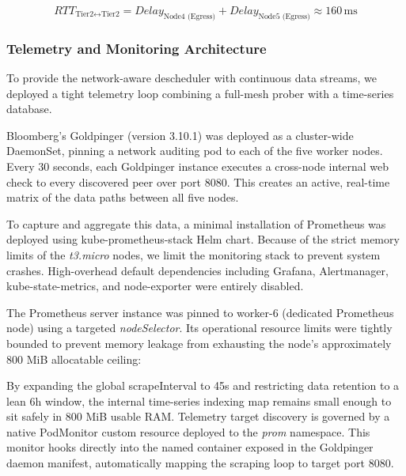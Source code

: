 \[
RTT_{\text{Tier2}\leftrightarrow\text{Tier2}} = Delay_{\text{Node4 (Egress)}} + Delay_{\text{Node5 (Egress)}} \approx 160\,\text{ms}
\]


\subsubsection{Telemetry and Monitoring Architecture}
\label{subsubsec:netaware4_monitoringsetup}
To provide the network-aware descheduler with continuous data streams, we deployed a tight telemetry loop combining a full-mesh prober with a time-series database.

Bloomberg's Goldpinger (version 3.10.1) was deployed as a cluster-wide DaemonSet, pinning a network auditing pod to each of the five worker nodes. Every 30 seconds, each Goldpinger instance executes a cross-node internal web check to every discovered peer over port 8080. This creates an active, real-time matrix of the data paths between all five nodes.

To capture and aggregate this data, a minimal installation of Prometheus was deployed using kube-prometheus-stack Helm chart. Because of the strict memory limits of the \textit{t3.micro} nodes, we limit the monitoring stack to prevent system crashes. High-overhead default dependencies including Grafana, Alertmanager, kube-state-metrics, and node-exporter were entirely disabled.

The Prometheus server instance was pinned to worker-6 (dedicated Prometheus node) using a targeted \emph{nodeSelector}. Its operational resource limits were tightly bounded to prevent memory leakage from exhausting the node's approximately 800 MiB allocatable ceiling:

\noindent\begin{minipage}{\linewidth}

\end{minipage}

By expanding the global scrapeInterval to 45s and restricting data retention to a lean 6h window, the internal time-series indexing map remains small enough to sit safely in 800 MiB usable RAM. Telemetry target discovery is governed by a native PodMonitor custom resource deployed to the \emph{prom} namespace. This monitor hooks directly into the named container exposed in the Goldpinger daemon manifest, automatically mapping the scraping loop to target port 8080.

